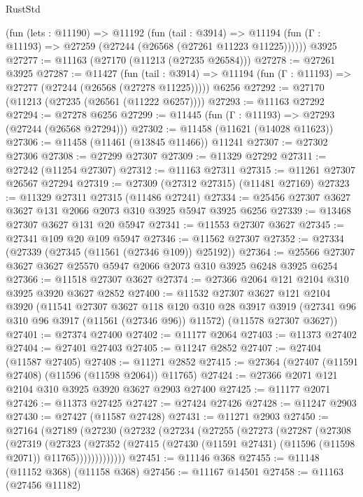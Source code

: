\begin{lexlean}{RustStd}
\begin{coremodule}
    (fun (lets : @11190) =>
    @11192
      (fun (tail : @3914) =>
      @11194 (fun (Γ : @11193) => @27259 (@27244 (@26568 (@27261 @11223 @11225))))))
    @3925
@27277 := @11163 (@27170 (@11213 (@27235 @26584)))
@27278 := @27261 @3925
@27287 := @11427
    (fun (tail : @3914) => @11194 (fun (Γ : @11193) => @27277 (@27244 (@26568 (@27278 @11225)))))
    @6256
@27292 := @27170 (@11213 (@27235 (@26561 (@11222 @6257))))
@27293 := @11163 @27292
@27294 := @27278 @6256
@27299 := @11445 (fun (Γ : @11193) => @27293 (@27244 (@26568 @27294)))
@27302 := @11458 (@11621 (@14028 @11623))
@27306 := @11458 (@11461 (@13845 @11466)) @11241
@27307 := @27302 @27306
@27308 := @27299 @27307
@27309 := @11329 @27292
@27311 := @27242 (@11254 @27307)
@27312 := @11163 @27311
@27315 := @11261 @27307 @26567 @27294
@27319 := @27309 (@27312 @27315) (@11481 @27169)
@27323 := @11329 @27311 @27315 (@11486 @27241)
@27334 := @25456 @27307 @3627 @3627 @131 @2066 @2073 @310 @3925 @5947 @3925 @6256
@27339 := @13468 @27307 @3627 @131 @20 @5947
@27341 := @11553 @27307 @3627
@27345 := @27341 @109 @20 @109 @5947
@27346 := @11562 @27307
@27352 := @27334 (@27339 (@27345 (@11561 (@27346 @109)) @25192))
@27364 := @25566 @27307 @3627 @3627 @25570 @5947 @2066 @2073 @310 @3925 @6248 @3925 @6254
@27366 := @11518 @27307 @3627
@27374 := @27366 @2064 @121 @2104 @310 @3925 @3920 @3627 @2852
@27400 := @11532
    @27307
    @3627
    @121
    @2104
    @3920
    (@11541
      @27307
      @3627
      @118
      @120
      @310
      @28
      @3917
      @3919
      (@27341 @96 @310 @96 @3917 (@11561 (@27346 @96)) @11572)
      (@11578 @27307 @3627))
@27401 := @27374 @27400
@27402 := @11177 @2064
@27403 := @11373 @27402
@27404 := @27401 @27403
@27405 := @11247 @2852
@27407 := @27404 (@11587 @27405)
@27408 := @11271 @2852
@27415 := @27364 (@27407 (@11591 @27408) (@11596 (@11598 @2064)) @11765)
@27424 := @27366 @2071 @121 @2104 @310 @3925 @3920 @3627 @2903 @27400
@27425 := @11177 @2071
@27426 := @11373 @27425
@27427 := @27424 @27426
@27428 := @11247 @2903
@27430 := @27427 (@11587 @27428)
@27431 := @11271 @2903
@27450 := @27164
    (@27189
      (@27230
        (@27232
          (@27234
            (@27255
              (@27273
                (@27287
                  (@27308
                    (@27319
                      (@27323
                        (@27352
                          (@27415
                            (@27430 (@11591 @27431) (@11596 (@11598 @2071)) @11765)))))))))))))
@27451 := @11146 @368
@27455 := @11148 (@11152 @368) (@11158 @368)
@27456 := @11167 @14501
@27458 := @11163 (@27456 @11182)

\end{coremodule}
\end{lexlean}
